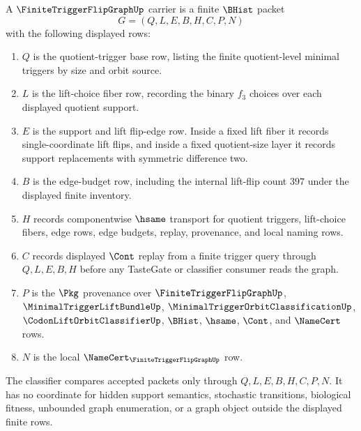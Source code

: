\begin{definition}
\label{def:finite-trigger-flip-graph-carrier}
A $\FiniteTriggerFlipGraphUp$ carrier is a finite $\BHist$ packet
$$
G=(Q,L,E,B,H,C,P,N)
$$
with the following displayed rows:
\begin{enumerate}
\item $Q$ is the quotient-trigger base row, listing the finite quotient-level minimal triggers by size and orbit source.
\item $L$ is the lift-choice fiber row, recording the binary $f_{3}$ choices over each displayed quotient support.
\item $E$ is the support and lift flip-edge row. Inside a fixed lift fiber it records single-coordinate lift flips, and inside a fixed quotient-size layer it records support replacements with symmetric difference two.
\item $B$ is the edge-budget row, including the internal lift-flip count $397$ under the displayed finite inventory.
\item $H$ records componentwise $\hsame$ transport for quotient triggers, lift-choice fibers, edge rows, edge budgets, replay, provenance, and local naming rows.
\item $C$ records displayed $\Cont$ replay from a finite trigger query through $Q,L,E,B,H$ before any TasteGate or classifier consumer reads the graph.
\item $P$ is the $\Pkg$ provenance over $\FiniteTriggerFlipGraphUp$, $\MinimalTriggerLiftBundleUp$, $\MinimalTriggerOrbitClassificationUp$, $\CodonLiftOrbitClassifierUp$, $\BHist$, $\hsame$, $\Cont$, and $\NameCert$ rows.
\item $N$ is the local $\NameCert_{\FiniteTriggerFlipGraphUp}$ row.
\end{enumerate}
The classifier compares accepted packets only through $Q,L,E,B,H,C,P,N$. It has no coordinate for hidden support semantics, stochastic transitions, biological fitness, unbounded graph enumeration, or a graph object outside the displayed finite rows.
\end{definition}

